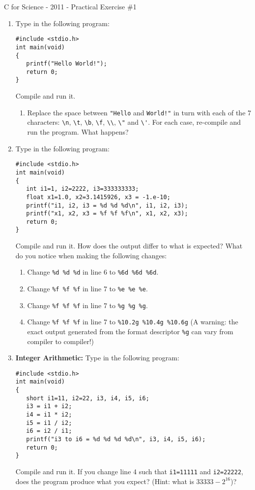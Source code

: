\documentclass[a4paper,12pt]{article}
\begin{document}
\begin{center}
\large C for Science - 2011 - Practical Exercise \#1
\end{center}

\begin{enumerate}
\item Type in the following program:
\begin{verbatim}
#include <stdio.h>
int main(void)
{
   printf("Hello World!");
   return 0;
}
\end{verbatim}
Compile and run it.
\begin{enumerate}
\item Replace the space between \verb|"Hello| and \verb|World!"| in turn with each of the 7 characters: \verb|\n|, \verb|\t|, \verb|\b|, \verb|\f|, \verb|\\|, \verb|\"| and \verb|\'|. For each case, re-compile and run the program.
What happens?
\end{enumerate}

\item Type in the following program:
\begin{verbatim}
#include <stdio.h>
int main(void)
{
   int i1=1, i2=2222, i3=333333333;
   float x1=1.0, x2=3.1415926, x3 = -1.e-10;
   printf("i1, i2, i3 = %d %d %d\n", i1, i2, i3);
   printf("x1, x2, x3 = %f %f %f\n", x1, x2, x3);
   return 0;
}
\end{verbatim}
Compile and run it. How does the output differ to what is expected? What do you notice when making the following changes:
\begin{enumerate}
\item Change \verb|%d %d %d| in line 6 to \verb|%6d %6d %6d|.
\item Change \verb|%f %f %f| in line 7 to \verb|%e %e %e|.
\item Change \verb|%f %f %f| in line 7 to \verb|%g %g %g|.
\item Change \verb|%f %f %f| in line 7 to \verb|%10.2g %10.4g %10.6g| (A warning: the exact output generated from the format descriptor \verb|%g| can vary from compiler to compiler!)
\end{enumerate}

\item {\bf Integer Arithmetic:} Type in the following program:
\begin{verbatim}
#include <stdio.h>
int main(void)
{
   short i1=11, i2=22, i3, i4, i5, i6;
   i3 = i1 + i2;
   i4 = i1 * i2;
   i5 = i1 / i2;
   i6 = i2 / i1;
   printf("i3 to i6 = %d %d %d %d\n", i3, i4, i5, i6);
   return 0;
}
\end{verbatim}
Compile and run it. If you change line 4 such that \verb|i1=11111| and \verb|i2=22222|, does the program produce what you expect? (Hint: what is $33333-2^{16}$)?


\end{enumerate}
\end{document}
